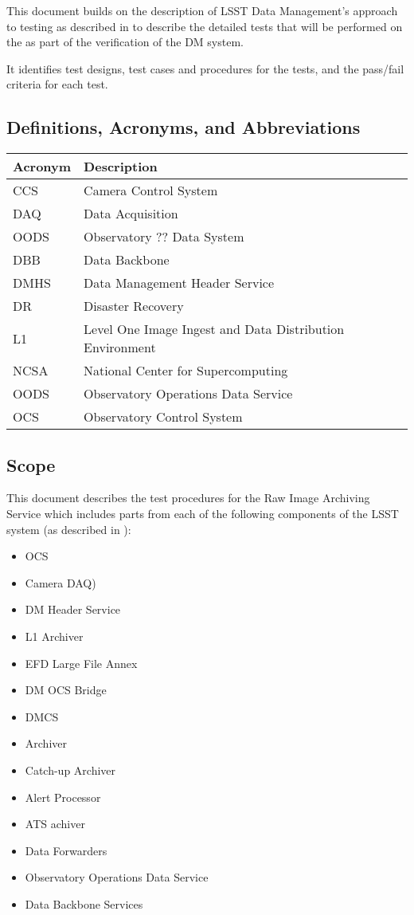 \documentclass[DM,lsstdraft,STS,toc]{lsstdoc}
\begin{document}
This document builds on the description of LSST Data Management's
approach to testing as described in  to describe
the detailed tests that will be performed on the \product{} as part
of the verification of the DM system.


It identifies test designs, test cases and procedures for the tests,
and the pass/fail criteria for each test.

\subsection{Definitions, Acronyms, and Abbreviations \label{sect:acronyms}}
\addtocounter{table}{-1}
\begin{longtable}{|l|p{}|}\hline
\textbf{Acronym} & \textbf{Description} \\\hline
CCS&Camera Control System \\\hline
DAQ&Data Acquisition\\\hline
OODS&Observatory ?? Data System\\\hline
DBB&Data Backbone \\\hline
DMHS&Data Management Header Service \\\hline
DR&Disaster Recovery \\\hline
L1&Level One Image Ingest and Data Distribution Environment \\\hline
NCSA&National Center for Supercomputing \\\hline
OODS&Observatory Operations Data Service \\\hline
OCS&Observatory Control System \\\hline
\end{longtable}


\subsection{Scope}
\label{sec:scope}


This document describes the test procedures for the Raw Image Archiving Service
which includes parts from each of the following components of the LSST system
(as described in ):


\begin{itemize}

\item{OCS}
\item{Camera DAQ)}
\item{DM Header Service}
\item{L1 Archiver}
\item{EFD Large File Annex}
\item{DM OCS Bridge}
\item{DMCS}
\item{Archiver}
\item{Catch-up Archiver}
\item{Alert Processor}
\item{ATS achiver}
\item {Data Forwarders}
\item{Observatory Operations Data Service}
\item{Data Backbone Services}


\end{itemize}
\end{document}
